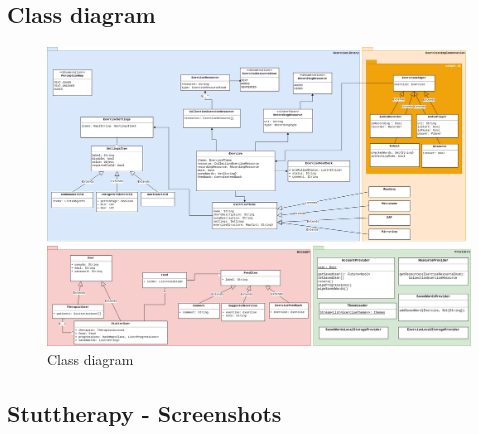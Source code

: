 \begin{appendices}
\begin{landscape}
\chapter{Class diagram}
\label{appendix:class}
\vspace{-35pt}
\begin{figure}[H]
  \includegraphics[width=0.9\linewidth]{content/imgs/app_class_diagram.png}
  \caption*{Class diagram}
\end{figure}
\end{landscape}


\begin{landscape}
\chapter{Stuttherapy - Screenshots}
\label{appendix:screenshots}


\end{landscape}
\end{appendices}
